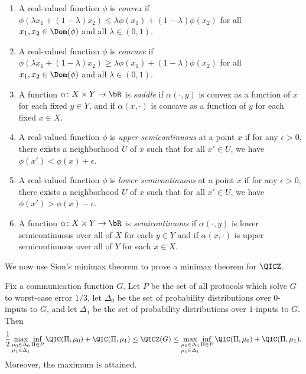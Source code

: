 \begin{enumerate}
\item A real-valued function $\phi$ is \emph{convex}
if $\phi(\lambda x_1+(1-\lambda)x_2)\le
\lambda \phi(x_1)+(1-\lambda)\phi(x_2)$
for all $x_1,x_2\in\Dom(\phi)$ and all $\lambda\in(0,1)$.
\item A real-valued function $\phi$ is \emph{concave}
if $\phi(\lambda x_1+(1-\lambda)x_2)\ge
\lambda \phi(x_1)+(1-\lambda)\phi(x_2)$
for all $x_1,x_2\in\Dom(\phi)$ and all $\lambda\in(0,1)$.
\item A function $\alpha\colon X\times Y\to\bR$ is \emph{saddle}
if $\alpha(\cdot, y)$ is convex as a function of
$x$ for each fixed $y\in Y$, and if $\alpha(x,\cdot)$
is concave as a function of $y$ for each fixed $x\in X$.
\item A real-valued function $\phi$ is \emph{upper semicontinuous}
at a point $x$ if for any $\epsilon>0$, there exists
a neighborhood $U$ of $x$ such that for all $x'\in U$,
we have $\phi(x')<\phi(x)+\epsilon$.
\item A real-valued function $\phi$ is \emph{lower semicontinuous}
at a point $x$ if for any $\epsilon>0$, there exists
a neighborhood $U$ of $x$ such that for all $x'\in U$,
we have $\phi(x')>\phi(x)-\epsilon$.
\item A function $\alpha\colon X\times Y\to\bR$
is \emph{semicontinuous} if $\alpha(\cdot,y)$ is lower semicontinuous
over all of $X$ for each $y\in Y$ and if $\alpha(x,\cdot)$
is upper semicontinuous over all of $Y$ for each $x\in X$.
\end{enumerate}

We now use Sion's minimax theorem to prove a minimax theorem
for $\QICZ$.

\begin{theorem}\label{thm:QICZ_minimax}
Fix a communication function $G$. Let $P$
be the set of all protocols which solve $G$ to worst-case
error $1/3$, let $\Delta_0$ be the set of probability
distributions over $0$-inputs to $G$, and let
$\Delta_1$ be the set of probability distributions
over $1$-inputs to $G$. Then
\[\frac12 
\max_{\substack{\mu_0\in\Delta_0\\\mu_1\in\Delta_1}}
\inf_{\Pi\in P}\QIC(\Pi,\mu_0)+\QIC(\Pi,\mu_1)
\le \QICZ(G)\le 
\max_{\substack{\mu_0\in\Delta_0\\\mu_1\in\Delta_1}}
\inf_{\Pi\in P}\QIC(\Pi,\mu_0)+\QIC(\Pi,\mu_1).\]
Moreover, the maximum is attained.
\end{theorem}

